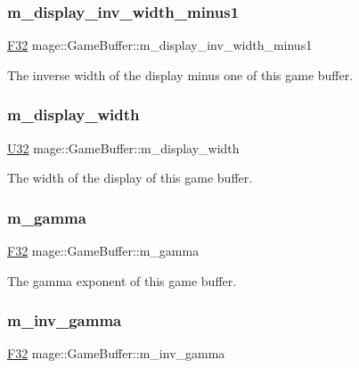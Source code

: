 \subsubsection{\texorpdfstring{m\+\_\+display\+\_\+inv\+\_\+width\+\_\+minus1}{m\_display\_inv\_width\_minus1}}
{\footnotesize\ttfamily \hyperlink{namespacemage_aa97e833b45f06d60a0a9c4fc22ae02c0}{F32} mage\+::\+Game\+Buffer\+::m\+\_\+display\+\_\+inv\+\_\+width\+\_\+minus1}

The inverse width of the display minus one of this game buffer. \hypertarget{structmage_1_1_game_buffer_abc3b318a7c0d608bd1d72124032d7af8}{}\label{structmage_1_1_game_buffer_abc3b318a7c0d608bd1d72124032d7af8} 
\subsubsection{\texorpdfstring{m\+\_\+display\+\_\+width}{m\_display\_width}}
{\footnotesize\ttfamily \hyperlink{namespacemage_a41c104c036fba3756a74e19f793eeaa1}{U32} mage\+::\+Game\+Buffer\+::m\+\_\+display\+\_\+width}

The width of the display of this game buffer. \hypertarget{structmage_1_1_game_buffer_a7c7abe0dbee37447b27c9e7f7c95d479}{}\label{structmage_1_1_game_buffer_a7c7abe0dbee37447b27c9e7f7c95d479} 
\subsubsection{\texorpdfstring{m\+\_\+gamma}{m\_gamma}}
{\footnotesize\ttfamily \hyperlink{namespacemage_aa97e833b45f06d60a0a9c4fc22ae02c0}{F32} mage\+::\+Game\+Buffer\+::m\+\_\+gamma}

The gamma exponent of this game buffer. \hypertarget{structmage_1_1_game_buffer_a52ddb29e16782a4dcc4e6818b3983c20}{}\label{structmage_1_1_game_buffer_a52ddb29e16782a4dcc4e6818b3983c20} 
\subsubsection{\texorpdfstring{m\+\_\+inv\+\_\+gamma}{m\_inv\_gamma}}
{\footnotesize\ttfamily \hyperlink{namespacemage_aa97e833b45f06d60a0a9c4fc22ae02c0}{F32} mage\+::\+Game\+Buffer\+::m\+\_\+inv\+\_\+gamma}


